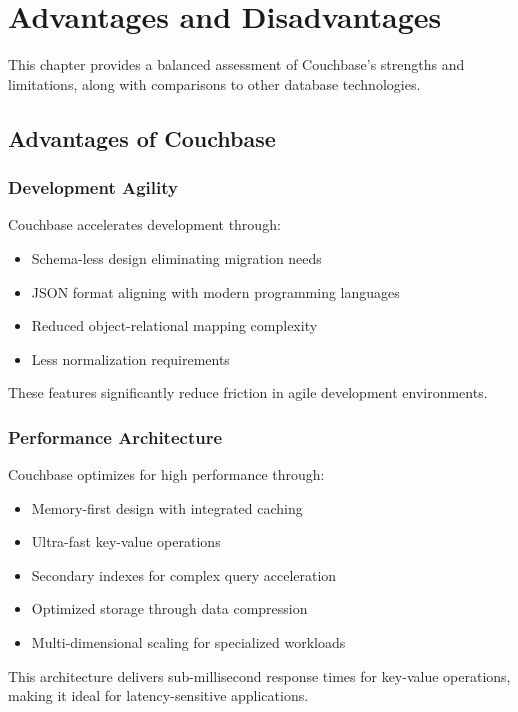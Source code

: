 \chapter{Advantages and Disadvantages}

This chapter provides a balanced assessment of Couchbase's strengths and limitations, along with comparisons to other database technologies.

\section{Advantages of Couchbase}

\subsection{Development Agility}

Couchbase accelerates development through:
\begin{itemize}
  \item Schema-less design eliminating migration needs
  \item JSON format aligning with modern programming languages
  \item Reduced object-relational mapping complexity
  \item Less normalization requirements
\end{itemize}

These features significantly reduce friction in agile development environments.

\subsection{Performance Architecture}

Couchbase optimizes for high performance through:
\begin{itemize}
  \item Memory-first design with integrated caching
  \item Ultra-fast key-value operations
  \item Secondary indexes for complex query acceleration
  \item Optimized storage through data compression
  \item Multi-dimensional scaling for specialized workloads
\end{itemize}

This architecture delivers sub-millisecond response times for key-value operations, making it ideal for latency-sensitive applications.


